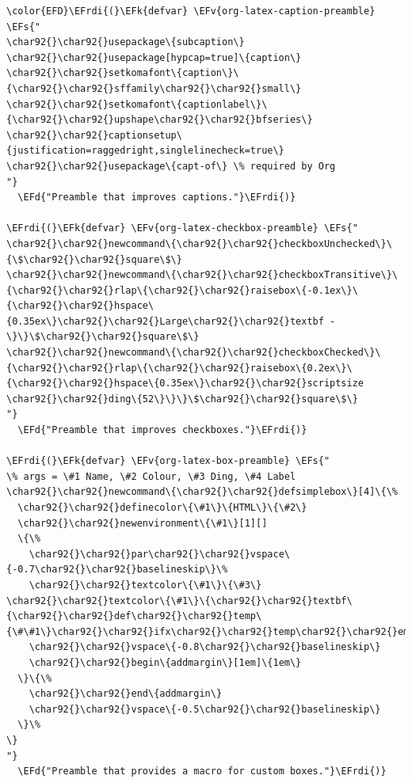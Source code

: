 \documentclass{scrartcl}
\newcommand{\EFk}[1]{\textcolor{EFk}{#1}} %
\newcommand{\EFd}[1]{\textcolor{EFd}{\textit{#1}}} %
\newcommand{\EFs}[1]{\textcolor{EFs}{#1}} %
\newcommand{\EFv}[1]{\textcolor{EFv}{#1}} %
\newcommand{\EFrdi}[1]{\textcolor{EFrdi}{#1}} %
\begin{document}
\begin{Code}
\begin{Verbatim}[]
\color{EFD}\EFrdi{(}\EFk{defvar} \EFv{org-latex-caption-preamble} \EFs{"
\char92{}\char92{}usepackage\{subcaption\}
\char92{}\char92{}usepackage[hypcap=true]\{caption\}
\char92{}\char92{}setkomafont\{caption\}\{\char92{}\char92{}sffamily\char92{}\char92{}small\}
\char92{}\char92{}setkomafont\{captionlabel\}\{\char92{}\char92{}upshape\char92{}\char92{}bfseries\}
\char92{}\char92{}captionsetup\{justification=raggedright,singlelinecheck=true\}
\char92{}\char92{}usepackage\{capt-of\} \% required by Org
"}
  \EFd{"Preamble that improves captions."}\EFrdi{)}

\EFrdi{(}\EFk{defvar} \EFv{org-latex-checkbox-preamble} \EFs{"
\char92{}\char92{}newcommand\{\char92{}\char92{}checkboxUnchecked\}\{\$\char92{}\char92{}square\$\}
\char92{}\char92{}newcommand\{\char92{}\char92{}checkboxTransitive\}\{\char92{}\char92{}rlap\{\char92{}\char92{}raisebox\{-0.1ex\}\{\char92{}\char92{}hspace\{0.35ex\}\char92{}\char92{}Large\char92{}\char92{}textbf -\}\}\$\char92{}\char92{}square\$\}
\char92{}\char92{}newcommand\{\char92{}\char92{}checkboxChecked\}\{\char92{}\char92{}rlap\{\char92{}\char92{}raisebox\{0.2ex\}\{\char92{}\char92{}hspace\{0.35ex\}\char92{}\char92{}scriptsize \char92{}\char92{}ding\{52\}\}\}\$\char92{}\char92{}square\$\}
"}
  \EFd{"Preamble that improves checkboxes."}\EFrdi{)}

\EFrdi{(}\EFk{defvar} \EFv{org-latex-box-preamble} \EFs{"
\% args = \#1 Name, \#2 Colour, \#3 Ding, \#4 Label
\char92{}\char92{}newcommand\{\char92{}\char92{}defsimplebox\}[4]\{\%
  \char92{}\char92{}definecolor\{\#1\}\{HTML\}\{\#2\}
  \char92{}\char92{}newenvironment\{\#1\}[1][]
  \{\%
    \char92{}\char92{}par\char92{}\char92{}vspace\{-0.7\char92{}\char92{}baselineskip\}\%
    \char92{}\char92{}textcolor\{\#1\}\{\#3\} \char92{}\char92{}textcolor\{\#1\}\{\char92{}\char92{}textbf\{\char92{}\char92{}def\char92{}\char92{}temp\{\#\#1\}\char92{}\char92{}ifx\char92{}\char92{}temp\char92{}\char92{}empty\#4\char92{}\char92{}else\#\#1\char92{}\char92{}fi\}\}\%
    \char92{}\char92{}vspace\{-0.8\char92{}\char92{}baselineskip\}
    \char92{}\char92{}begin\{addmargin\}[1em]\{1em\}
  \}\{\%
    \char92{}\char92{}end\{addmargin\}
    \char92{}\char92{}vspace\{-0.5\char92{}\char92{}baselineskip\}
  \}\%
\}
"}
  \EFd{"Preamble that provides a macro for custom boxes."}\EFrdi{)}
\end{Verbatim}
\end{Code}
\end{document}

